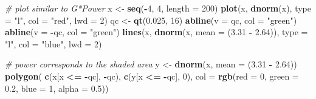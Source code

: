 \documentclass[
  12pt,
]{book}
\newenvironment{Shaded}{\begin{snugshade}}{\end{snugshade}}
\newcommand{\CommentTok}[1]{\textcolor[rgb]{0.56,0.35,0.01}{\textit{#1}}}
\newcommand{\DataTypeTok}[1]{\textcolor[rgb]{0.13,0.29,0.53}{#1}}
\newcommand{\DecValTok}[1]{\textcolor[rgb]{0.00,0.00,0.81}{#1}}
\newcommand{\FloatTok}[1]{\textcolor[rgb]{0.00,0.00,0.81}{#1}}
\newcommand{\KeywordTok}[1]{\textcolor[rgb]{0.13,0.29,0.53}{\textbf{#1}}}
\newcommand{\NormalTok}[1]{#1}
\newcommand{\OperatorTok}[1]{\textcolor[rgb]{0.81,0.36,0.00}{\textbf{#1}}}
\newcommand{\StringTok}[1]{\textcolor[rgb]{0.31,0.60,0.02}{#1}}
\begin{document}
\begin{Shaded}
\begin{Highlighting}[]
\CommentTok{\# plot similar to G*Power}
\NormalTok{x \textless{}{-}}\StringTok{ }\KeywordTok{seq}\NormalTok{(}\OperatorTok{{-}}\DecValTok{4}\NormalTok{, }\DecValTok{4}\NormalTok{, }\DataTypeTok{length =} \DecValTok{200}\NormalTok{)}
\KeywordTok{plot}\NormalTok{(x, }\KeywordTok{dnorm}\NormalTok{(x), }\DataTypeTok{type =} \StringTok{"l"}\NormalTok{, }\DataTypeTok{col =} \StringTok{"red"}\NormalTok{, }\DataTypeTok{lwd =} \DecValTok{2}\NormalTok{)}
\NormalTok{qc \textless{}{-}}\StringTok{ }\KeywordTok{qt}\NormalTok{(}\FloatTok{0.025}\NormalTok{, }\DecValTok{16}\NormalTok{)}
\KeywordTok{abline}\NormalTok{(}\DataTypeTok{v =}\NormalTok{ qc, }\DataTypeTok{col =} \StringTok{"green"}\NormalTok{)}
\KeywordTok{abline}\NormalTok{(}\DataTypeTok{v =} \OperatorTok{{-}}\NormalTok{qc, }\DataTypeTok{col =} \StringTok{"green"}\NormalTok{)}
\KeywordTok{lines}\NormalTok{(x, }\KeywordTok{dnorm}\NormalTok{(x, }\DataTypeTok{mean =}\NormalTok{ (}\FloatTok{3.31} \OperatorTok{{-}}\StringTok{ }\FloatTok{2.64}\NormalTok{)), }\DataTypeTok{type =} \StringTok{"l"}\NormalTok{, }\DataTypeTok{col =} \StringTok{"blue"}\NormalTok{, }\DataTypeTok{lwd =} \DecValTok{2}\NormalTok{)}

\CommentTok{\# power corresponds to the shaded area}
\NormalTok{y \textless{}{-}}\StringTok{ }\KeywordTok{dnorm}\NormalTok{(x, }\DataTypeTok{mean =}\NormalTok{ (}\FloatTok{3.31} \OperatorTok{{-}}\StringTok{ }\FloatTok{2.64}\NormalTok{))}
\KeywordTok{polygon}\NormalTok{(}
  \KeywordTok{c}\NormalTok{(x[x }\OperatorTok{\textless{}=}\StringTok{ }\OperatorTok{{-}}\NormalTok{qc], }\OperatorTok{{-}}\NormalTok{qc), }\KeywordTok{c}\NormalTok{(y[x }\OperatorTok{\textless{}=}\StringTok{ }\OperatorTok{{-}}\NormalTok{qc], }\DecValTok{0}\NormalTok{),}
  \DataTypeTok{col =} \KeywordTok{rgb}\NormalTok{(}\DataTypeTok{red =} \DecValTok{0}\NormalTok{, }\DataTypeTok{green =} \FloatTok{0.2}\NormalTok{, }\DataTypeTok{blue =} \DecValTok{1}\NormalTok{, }\DataTypeTok{alpha =} \FloatTok{0.5}\NormalTok{))}
\end{Highlighting}
\end{Shaded}
\end{document}

